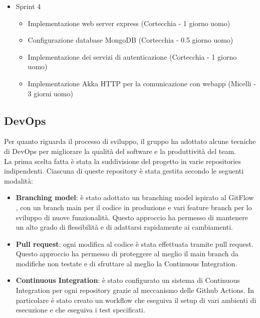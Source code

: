\begin{itemize}
\begin{itemize}
          \end{itemize}
    \item Sprint 4
          \begin{itemize}
              \item Implementazione web server express (Cortecchia - 1 giorno uomo)
              \item Configurazione database MongoDB (Cortecchia - 0.5 giorno uomo)
              \item Implementazione dei servizi di autenticazione (Cortecchia - 1 giorno uomo)
              \item Implementazione Akka HTTP per la comunicazione con webapp (Micelli - 3 giorni uomo)
          \end{itemize}
\end{itemize}

\subsection{DevOps}
Per quanto riguarda il processo di sviluppo, il gruppo ha adottato alcune tecniche di DevOps
per migliorare la qualità del software e la produttività del team.\\

La prima scelta fatta è stata la suddivisione del progetto in varie repositories indipendenti.
Ciascuna di queste repository è stata gestita secondo le seguenti modalità:

\begin{itemize}
    \item \textbf{Branching model}: è stato adottato un branching model ispirato al GitFlow \cite{gitflow},
          con un branch main per il codice in produzione e vari feature branch per lo sviluppo di nuove
          funzionalità. Questo approccio ha permesso di mantenere un alto grado di flessibilità e di adattarsi
          rapidamente ai cambiamenti.
    \item \textbf{Pull request}: ogni modifica al codice è stata effettuata tramite pull request.
          Questo approccio ha permesso di proteggere al meglio il main branch da modifiche non testate e
          di sfruttare al meglio la Continuous Integration.
    \item \textbf{Continuous Integration}: è stato configurato un sistema di Continuous Integration
          per ogni repository grazie al meccanismo delle Github Actions. In particolare è stato creato
          un workflow che eseguiva il setup di vari ambienti di esecuzione e che eseguiva i test specificati.
\end{itemize}


